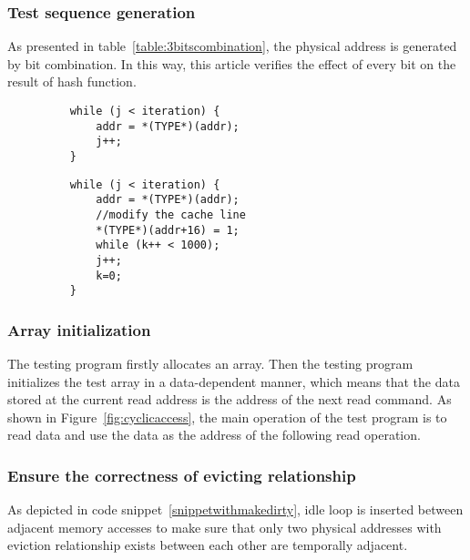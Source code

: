 \documentclass[conference]{IEEEtran}
\begin{document}
\subsubsection{Test sequence generation} 
As presented in table~\ref{table:3bitscombination}, the physical address is generated by bit combination. In this way, this article verifies the effect of every bit on the result of hash function. 
\begin{figure}[!htp]
\centering
{}
\begin{lstlisting}
    while (j < iteration) {
        addr = *(TYPE*)(addr);
        j++;
    }
\end{lstlisting}
\end{figure}
\begin{figure}[!htp]
	\centering
{}
\begin{lstlisting}
    while (j < iteration) {
        addr = *(TYPE*)(addr);
        //modify the cache line
        *(TYPE*)(addr+16) = 1; 
        while (k++ < 1000);
        j++;
        k=0;
    }
\end{lstlisting}
\end{figure}
\subsubsection{Array initialization}
The testing program firstly allocates an array. Then the testing program initializes the test array in a data-dependent manner, which means that the data stored at the current read address is the address of the next read command. As shown in Figure~\ref{fig:cyclicaccess}, the main operation of the test program is to read data and use the data as the address of the following read operation. 
\subsubsection{Ensure the correctness of evicting relationship}
As depicted in code snippet~\ref{snippetwithmakedirty}, idle loop is inserted between adjacent memory accesses to make sure that only two physical addresses with eviction relationship exists between each other are temporally adjacent.
\end{document}
